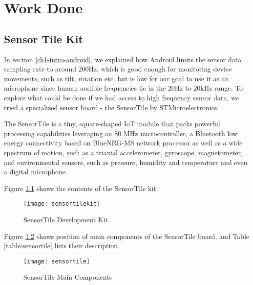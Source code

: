 \chapter{Work Done}


\section{Sensor Tile Kit}

In section \ref{ch1-intro-android}, we explained how Android limits the sensor data sampling rate to around 200Hz, which is good enough for monitoring device movements, such as tilt, rotation etc.
but is low for our goal to use it as an microphone since human audible frequencies lie in the 20Hz to 20kHz range.
To explore what could be done if we had access to high frequency sensor data, we tried a specialized sensor board - the SensorTile by STMicroelectronics.

The SensorTile is a tiny, square-shaped IoT module that packs powerful processing capabilities leveraging an 80 MHz microcontroller, a Bluetooth low energy connectivity based on BlueNRG-MS network processor as well as a wide spectrum of motion, such as a triaxial accelerometer, gyroscope, magnetometer, and environmental sensors, such as pressure, humidity and temperature and even a digital microphone. \cite{stkit}

Figure \ref{fig:sensortilekit} shows the contents of the SensorTile kit.

\begin{figure}[H] \begin{center}
\texttt{[image: sensortilekit]}
\caption{SensorTile Development Kit}
\label{fig:sensortilekit}
\end{center} \end{figure}

\newpage

Figure \ref{fig:sensortile} shows position of main components of the SensorTile board, and Table \ref{table:sensortile} lists their description. \cite{stkitmanual}

\begin{figure}[H] \begin{center}
\texttt{[image: sensortile]}
\caption{SensorTile Main Components}
\label{fig:sensortile}
\end{center} \end{figure}

